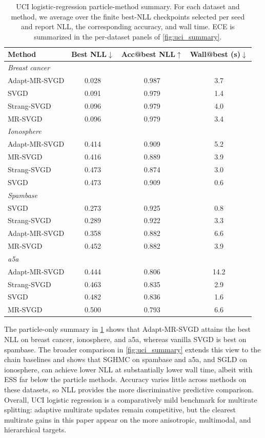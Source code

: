 \begin{table}[t]
  \centering
  \scriptsize
  \setlength{\tabcolsep}{4pt}
  \begin{tabular}{lccc}
    \toprule
    Method & Best NLL$\downarrow$ & Acc@best NLL$\uparrow$ & Wall@best (s)$\downarrow$ \\
    \midrule
    \multicolumn{4}{l}{\textit{Breast cancer}} \\
    Adapt-MR-SVGD & 0.028 & 0.987 & 3.7 \\
    SVGD & 0.091 & 0.979 & 1.4 \\
    Strang-SVGD & 0.096 & 0.979 & 4.0 \\
    MR-SVGD & 0.096 & 0.979 & 3.4 \\
    \midrule
    \multicolumn{4}{l}{\textit{Ionosphere}} \\
    Adapt-MR-SVGD & 0.414 & 0.909 & 5.2 \\
    MR-SVGD & 0.416 & 0.889 & 3.9 \\
    Strang-SVGD & 0.473 & 0.874 & 3.0 \\
    SVGD & 0.473 & 0.909 & 0.6 \\
    \midrule
    \multicolumn{4}{l}{\textit{Spambase}} \\
    SVGD & 0.273 & 0.925 & 0.8 \\
    Strang-SVGD & 0.289 & 0.922 & 3.3 \\
    Adapt-MR-SVGD & 0.358 & 0.882 & 6.6 \\
    MR-SVGD & 0.452 & 0.882 & 3.9 \\
    \midrule
    \multicolumn{4}{l}{\textit{a5a}} \\
    Adapt-MR-SVGD & 0.444 & 0.806 & 14.2 \\
    Strang-SVGD & 0.463 & 0.835 & 2.9 \\
    SVGD & 0.482 & 0.836 & 1.6 \\
    MR-SVGD & 0.500 & 0.793 & 6.6 \\
    \bottomrule
  \end{tabular}
  \caption{UCI logistic-regression particle-method summary. For each dataset
  and method, we average over the finite best-NLL checkpoints selected per seed
  and report NLL, the corresponding accuracy, and wall time. ECE is summarized
  in the per-dataset panels of \cref{fig:uci_summary}.}
  \label{tab:uci_nll_summary}
\end{table}

The particle-only summary in \cref{tab:uci_nll_summary} shows that
Adapt-MR-SVGD attains the best NLL on breast cancer, ionosphere, and a5a,
whereas vanilla SVGD is best on spambase. The broader comparison in
\cref{fig:uci_summary} extends this view to the chain baselines and shows that
SGHMC on spambase and a5a, and SGLD on ionosphere, can achieve lower NLL at
substantially lower wall time, albeit with ESS far below the particle methods.
Accuracy varies little across methods on these datasets, so NLL provides the
more discriminative predictive comparison. Overall, UCI logistic regression is
a comparatively mild benchmark for multirate splitting: adaptive multirate
updates remain competitive, but the clearest multirate gains in this paper
appear on the more anisotropic, multimodal, and hierarchical targets.

